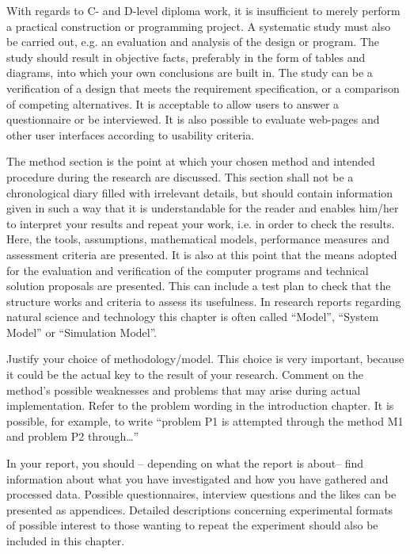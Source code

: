 With regards to C- and D-level diploma work, it is insufficient to merely
perform a practical construction or programming project. A systematic
study must also be carried out, e.g. an evaluation and analysis of the
design or program. The study should result in objective facts, preferably
in the form of tables and diagrams, into which your own conclusions are
built in. The study can be a verification of a design that meets the
requirement specification, or a comparison of competing alternatives. It
is acceptable to allow users to answer a questionnaire or be interviewed.
It is also possible to evaluate web-pages and other user interfaces
according to usability criteria.

The method section is the point at which your chosen method and
intended procedure during the research are discussed. This section shall
not be a chronological diary filled with irrelevant details, but should
contain information given in such a way that it is understandable for the
reader and enables him/her to interpret your results and repeat your
work, i.e. in order to check the results. Here, the tools, assumptions,
mathematical models, performance measures and assessment criteria
are presented. It is also at this point that the means adopted for the
evaluation and verification of the computer programs and technical
solution proposals are presented. This can include a test plan to check
that the structure works and criteria to assess its usefulness. In research
reports regarding natural science and technology this chapter is often
called “Model”, “System Model” or “Simulation Model”.

Justify your choice of methodology/model. This choice is very important,
because it could be the actual key to the result of your research.
Comment on the method's possible weaknesses and problems that may
arise during actual implementation. Refer to the problem wording in the
introduction chapter. It is possible, for example, to write “problem P1 is
attempted through the method M1 and problem P2 through…”

In your report, you should – depending on what the report is about–
find information about what you have investigated and how you have
gathered and processed data. Possible questionnaires, interview
questions and the likes can be presented as appendices. Detailed
descriptions concerning experimental formats of possible interest to 
those wanting to repeat the experiment should also be included in this
chapter.